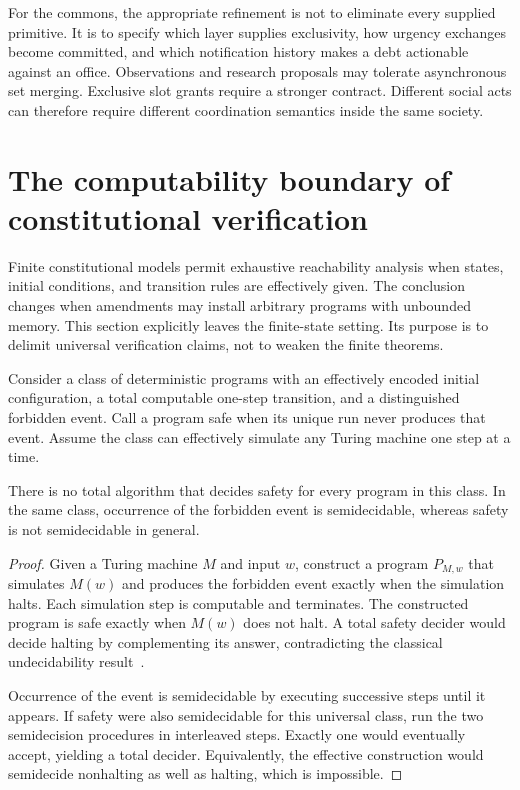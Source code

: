 For the commons, the appropriate refinement is not to eliminate every supplied primitive. It is to specify which layer supplies exclusivity, how urgency exchanges become committed, and which notification history makes a debt actionable against an office. Observations and research proposals may tolerate asynchronous set merging. Exclusive slot grants require a stronger contract. Different social acts can therefore require different coordination semantics inside the same society.


\section{The computability boundary of constitutional verification}\label{MS:sec:computability}
Finite constitutional models permit exhaustive reachability analysis when states, initial conditions, and transition rules are effectively given. The conclusion changes when amendments may install arbitrary programs with unbounded memory. This section explicitly leaves the finite-state setting. Its purpose is to delimit universal verification claims, not to weaken the finite theorems.

Consider a class of deterministic programs with an effectively encoded initial configuration, a total computable one-step transition, and a distinguished forbidden event. Call a program safe when its unique run never produces that event. Assume the class can effectively simulate any Turing machine one step at a time.

\begin{MStheorem}\label{MS:thm:undecidable}
There is no total algorithm that decides safety for every program in this class. In the same class, occurrence of the forbidden event is semidecidable, whereas safety is not semidecidable in general.
\end{MStheorem}
\begin{proof}
Given a Turing machine $M$ and input $w$, construct a program $P_{M,w}$ that simulates $M(w)$ and produces the forbidden event exactly when the simulation halts. Each simulation step is computable and terminates. The constructed program is safe exactly when $M(w)$ does not halt. A total safety decider would decide halting by complementing its answer, contradicting the classical undecidability result~\cite{MS:turing}.

Occurrence of the event is semidecidable by executing successive steps until it appears. If safety were also semidecidable for this universal class, run the two semidecision procedures in interleaved steps. Exactly one would eventually accept, yielding a total decider. Equivalently, the effective construction would semidecide nonhalting as well as halting, which is impossible.
\end{proof}

